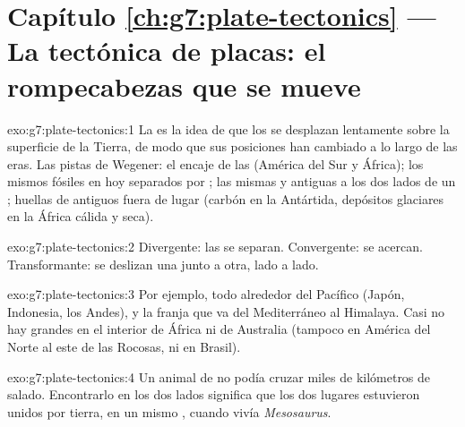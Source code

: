\section*{Capítulo \ref{ch:g7:plate-tectonics} --- La tectónica de placas: el rompecabezas que se mueve}

\begin{solution}{exo:g7:plate-tectonics:1}
La  es la idea de que los  se desplazan
lentamente sobre la superficie de la Tierra, de modo que sus posiciones han
cambiado a lo largo de las eras. Las pistas de Wegener: el encaje de las
 (América del Sur y África); los mismos fósiles en  hoy
separados por ; las mismas  y antiguas  a los dos
lados de un ; huellas de  antiguos fuera de lugar (carbón en la
Antártida, depósitos glaciares en la África cálida y seca).
\end{solution}

\begin{solution}{exo:g7:plate-tectonics:2}
Divergente: las  se separan. Convergente: se acercan. Transformante:
se deslizan una junto a otra, lado a lado.
\end{solution}

\begin{solution}{exo:g7:plate-tectonics:3}
Por ejemplo, todo alrededor del  Pacífico (Japón, Indonesia, los
Andes), y la franja que va del Mediterráneo al Himalaya. Casi no hay
grandes  en el interior de África ni de Australia (tampoco en
América del Norte al este de las  Rocosas, ni en Brasil).
\end{solution}

\begin{solution}{exo:g7:plate-tectonics:4}
Un animal de  no podía cruzar miles de kilómetros de 
salado. Encontrarlo en los dos lados significa que los dos lugares
estuvieron unidos por tierra, en un mismo , cuando vivía
\emph{Mesosaurus}.
\end{solution}

